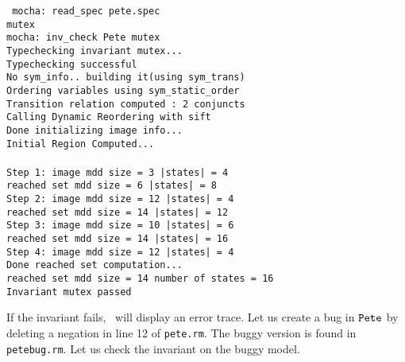 \mypar
{\tt 
mocha: read\_spec pete.spec \\
mutex \\
mocha: inv\_check Pete mutex \\
Typechecking invariant mutex... \\
Typechecking successful \\
No sym\_info.. building it(using sym\_trans) \\
Ordering variables using sym\_static\_order \\
Transition relation computed : 2 conjuncts \\
Calling Dynamic Reordering with sift \\
Done initializing image info...\\
Initial Region Computed... \\
\\
Step 1: image mdd size =          3      |states| =        4    \\
reached set mdd size =          6        |states| =        8 \\
Step 2: image mdd size =         12      |states| =        4 \\
reached set mdd size =         14        |states| =       12 \\
Step 3: image mdd size =         10      |states| =        6 \\
reached set mdd size =         14        |states| =       16 \\
Step 4: image mdd size =         12      |states| =        4 \\
Done reached set computation... \\
reached set mdd size =         14        number of states =       16 \\
Invariant mutex passed\\
}

\mypar
If the invariant fails, \mocha\ will display an error trace.
Let us create a bug in $\mbox{\tt Pete}$ by deleting a negation in line 12
of {\tt pete.rm}. The buggy version is found in 
{\tt petebug.rm}. Let us check the invariant
on the buggy model.

